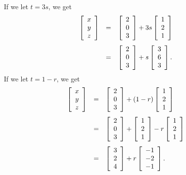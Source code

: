 \documentclass{ximera}
\begin{document}
\begin{solution}
  If we let $t=3s$, we get
  \begin{equation*}
    \begin{array}{rcl}
      \startmat{c} x \\ y \\ z \stopmat
      &=& \startmat{c} 2 \\ 0 \\ 3 \stopmat
      + 3s \startmat{c} 1 \\ 2 \\ 1 \stopmat\\\\[-1ex]
      &=& \startmat{c} 2 \\ 0 \\ 3 \stopmat
      + s \startmat{c} 3 \\ 6 \\ 3 \stopmat.
    \end{array}
  \end{equation*}
  If we let $t=1-r$, we get
  \begin{equation*}
    \begin{array}{rcl}
      \startmat{c} x \\ y \\ z \stopmat
      &=& \startmat{c} 2 \\ 0 \\ 3 \stopmat
      + (1-r) \startmat{c} 1 \\ 2 \\ 1 \stopmat\\\\[-1ex]
      &=& \startmat{c} 2 \\ 0 \\ 3 \stopmat
      + \startmat{c} 1 \\ 2 \\ 1 \stopmat
      - r \startmat{c} 1 \\ 2 \\ 1 \stopmat\\\\[-1ex]
      &=& \startmat{c} 3 \\ 2 \\ 4 \stopmat
      + r \startmat{c} -1 \\ -2 \\ -1 \stopmat.
    \end{array}
  \end{equation*}
\end{solution}
\end{document}
